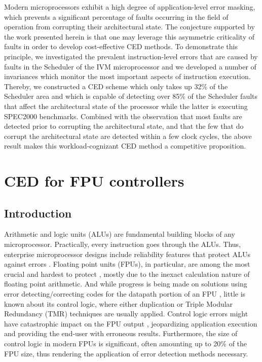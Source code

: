 \documentclass[12pt]{yalephd}
\begin{document}
Modern microprocessors exhibit a high degree of application-level error masking, which prevents a significant percentage of faults occurring in the field of operation from corrupting their architectural state. The conjecture supported by the work presented herein is that one may leverage this asymmetric criticality of faults in order to develop cost-effective CED methods. To demonstrate this principle, we investigated the prevalent instruction-level errors that are caused by faults in the Scheduler of the IVM microprocessor and we developed a number of invariances which monitor the most important aspects of instruction execution. Thereby, we constructed a CED scheme which only takes up 32\% of the Scheduler area and which is capable of detecting over 85\% of the Scheduler faults that affect the architectural state of the processor while the latter is executing SPEC2000 benchmarks. Combined with the observation that most faults are detected prior to corrupting the architectural state, and that the few that do corrupt the architectural state are detected within a few clock cycles, the above result makes this workload-cognizant CED method a competitive proposition.

\section{CED for FPU controllers}\label{sC2CEDFPU}

\subsection{Introduction}

Arithmetic and logic units (ALUs) are fundamental building blocks of any microprocessor. Practically, every instruction goes through the ALUs. Thus, enterprise microprocessor designs include reliability features that protect ALUs against errors \cite{patel1982concurrent, oh2002error, mueller1999ras, quach2000high}. Floating point units (FPUs), in particular, are among the most crucial and hardest to protect \cite{Ga94, NDJD01}, mostly due to the inexact calculation nature of floating point arithmetic. And while progress is being made on solutions using error detecting/correcting codes for the datapath portion of an FPU \cite{ECS09, lo1994reliable, shekarian2008low}, little is known about its control logic, where either duplication \cite{TSC692} or Triple Modular Redundancy (TMR) \cite{gallagher2000fault} techniques are usually applied. Control logic errors might have catastrophic impact on the FPU output \cite{lo1992sfs, langdon1970concurrent}, jeopardizing application execution and providing the end-user with erroneous results. Furthermore, the size of control logic in modern FPUs is significant, often amounting up to 20\% of the FPU size, thus rendering the application of error detection methods necessary.
\end{document}
